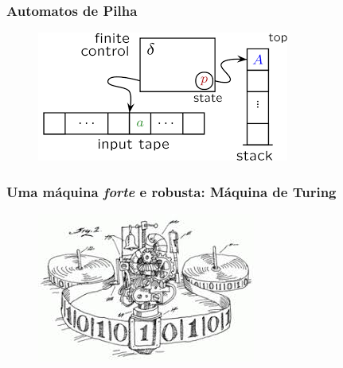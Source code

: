 \documentclass[10pt]{beamer}
\begin{document}
\begin{frame}[fragile]
\frametitle{Automatos de Pilha}
\begin{figure}[!ht]
	\centering
	\includegraphics[height =.5\textheight,width=.5\textwidth]
	{figuras/ap_elementos.png}
\end{figure}

\end{frame}






\begin{frame}[fragile]

\frametitle{Uma máquina \textit{ forte} e robusta: Máquina de Turing}
\begin{figure}[!ht]
\centering
\includegraphics[height =.65\textheight,width=.8\textwidth]	{figuras/old_TM.jpeg}
\end{figure}

\end{frame}



\end{document}
